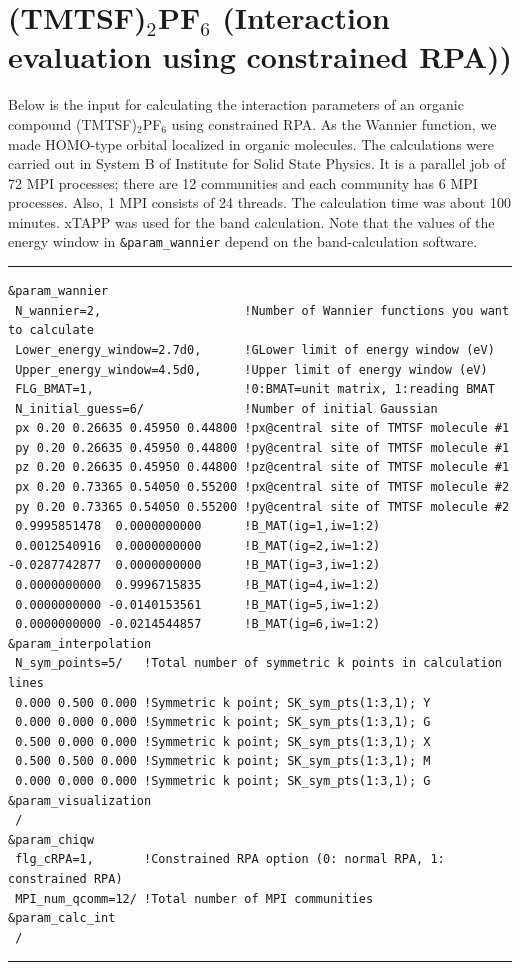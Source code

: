 \documentclass{article}
\begin{document}
\clearpage 

\section{\label{TMTSF}(TMTSF)$_2$PF$_6$ (Interaction evaluation using constrained RPA))} 
Below is the input for calculating the interaction parameters of an organic compound (TMTSF)$_2$PF$_6$ using constrained RPA. As the Wannier function, we made HOMO-type orbital localized in organic molecules. The calculations were carried out in System B of Institute for Solid State Physics. It is a parallel job of 72 MPI processes; there are 12 communities and each community has 6 MPI processes. Also, 1 MPI consists of 24 threads. The calculation time was about 100 minutes. {\sc xTAPP} was used for the band calculation. Note that the values of the energy window in {\tt \&param\_wannier} depend on the band-calculation software.
\vspace{3mm}\hrule
\begin{verbatim}
&param_wannier 
 N_wannier=2,                    !Number of Wannier functions you want to calculate
 Lower_energy_window=2.7d0,      !GLower limit of energy window (eV)
 Upper_energy_window=4.5d0,      !Upper limit of energy window (eV)
 FLG_BMAT=1,                     !0:BMAT=unit matrix, 1:reading BMAT    
 N_initial_guess=6/              !Number of initial Gaussian
 px 0.20 0.26635 0.45950 0.44800 !px@central site of TMTSF molecule #1
 py 0.20 0.26635 0.45950 0.44800 !py@central site of TMTSF molecule #1
 pz 0.20 0.26635 0.45950 0.44800 !pz@central site of TMTSF molecule #1
 px 0.20 0.73365 0.54050 0.55200 !px@central site of TMTSF molecule #2
 py 0.20 0.73365 0.54050 0.55200 !py@central site of TMTSF molecule #2
 0.9995851478  0.0000000000      !B_MAT(ig=1,iw=1:2)
 0.0012540916  0.0000000000      !B_MAT(ig=2,iw=1:2)
-0.0287742877  0.0000000000      !B_MAT(ig=3,iw=1:2)
 0.0000000000  0.9996715835      !B_MAT(ig=4,iw=1:2)
 0.0000000000 -0.0140153561      !B_MAT(ig=5,iw=1:2)
 0.0000000000 -0.0214544857      !B_MAT(ig=6,iw=1:2)
&param_interpolation   
 N_sym_points=5/   !Total number of symmetric k points in calculation lines
 0.000 0.500 0.000 !Symmetric k point; SK_sym_pts(1:3,1); Y
 0.000 0.000 0.000 !Symmetric k point; SK_sym_pts(1:3,1); G
 0.500 0.000 0.000 !Symmetric k point; SK_sym_pts(1:3,1); X
 0.500 0.500 0.000 !Symmetric k point; SK_sym_pts(1:3,1); M 
 0.000 0.000 0.000 !Symmetric k point; SK_sym_pts(1:3,1); G
&param_visualization   
 /
&param_chiqw 
 flg_cRPA=1,       !Constrained RPA option (0: normal RPA, 1: constrained RPA)
 MPI_num_qcomm=12/ !Total number of MPI communities
&param_calc_int 
 /
\end{verbatim}\hrule
\end{document}
